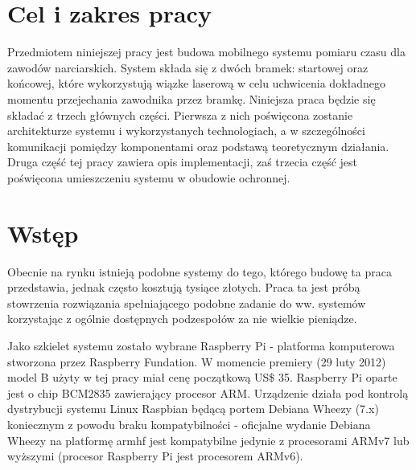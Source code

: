 \documentclass[11pt,a4paper, twoside]{article}
\begin{document}
 

\tableofcontents
\newpage	
\section{Cel i zakres pracy}
Przedmiotem niniejszej pracy jest budowa mobilnego systemu pomiaru czasu dla zawodów narciarskich. System składa się z dwóch bramek: startowej oraz końcowej, które wykorzystują wiązke laserową w celu uchwicenia dokładnego momentu przejechania zawodnika przez bramkę. Niniejsza praca będzie się składać z trzech głównych części. Pierwsza z nich poświęcona zostanie architekturze systemu i wykorzystanych technologiach, a w szczególności komunikacji pomiędzy komponentami oraz podstawą teoretycznym działania. Druga część tej pracy zawiera opis implementacji, zaś trzecia część jest poświęcona umieszczeniu systemu w obudowie ochronnej.
\section{Wstęp}
Obecnie na rynku istnieją podobne systemy do tego, którego budowę ta praca przedstawia, jednak często kosztują tysiące złotych. Praca ta jest próbą stowrzenia rozwiązania spełniającego podobne zadanie do ww. systemów korzystając z ogólnie dostępnych podzespołów za nie wielkie pieniądze.

Jako szkielet systemu zostało wybrane Raspberry Pi - platforma komputerowa stworzona przez Raspberry Fundation. W momencie premiery (29 luty 2012) model B użyty w tej pracy miał cenę początkową US\$ 35. Raspberry Pi oparte jest o chip BCM2835 zawierający procesor ARM. Urządzenie działa pod kontrolą dystrybucji systemu Linux Raspbian będącą portem Debiana Wheezy (7.x) koniecznym z powodu braku kompatybilności - oficjalne wydanie Debiana Wheezy na platformę armhf jest kompatybilne jedynie z procesorami ARMv7 lub wyższymi (procesor Raspberry Pi jest procesorem ARMv6).
\end{document}
